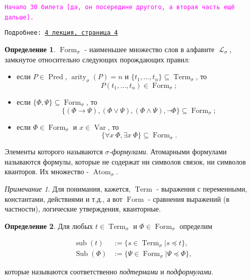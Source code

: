 \documentclass[a4paper,100pt]{article}
\theoremstyle{indented}
\theoremstyle{definition}
\newtheorem{defn}{Определение}
\theoremstyle{remark}
\newtheorem{remark}{Примечание}
\DeclareMathOperator{\ra}{\rightarrow}
\DeclareMathOperator{\LL}{\mathscr{L}}
\DeclareMathOperator{\form}{Form}
\DeclareMathOperator{\Pred}{Pred}
\DeclareMathOperator{\arity}{arity}
\DeclareMathOperator{\Var}{Var}
\DeclareMathOperator{\Term}{Term}
\DeclareMathOperator{\sub}{sub}
\DeclareMathOperator{\Sub}{Sub}
\DeclareMathOperator{\Atom}{Atom}
\begin{document}
\hrulefill

\texttt{\hypertarget{b30}{\textcolor{magenta}{Начало 30 билета [да, он посередине другого, а вторая часть ещё дальше].}}} \ 

\texttt{Подробнее: \href{http://www.mi-ras.ru/~speranski/courses/logic-1-2021-spring/slides_4.pdf}{4 лекция, страница 4}} 

\begin{defn}
  $\form_\sigma$ - наименьшее множество слов в алфавите $\LL_\sigma$, замкнутое относительно следующих порождающих правил:

  \begin{itemize}
    \item если $P\in \Pred$, $\arity_\sigma(P)=n$ и $\{t_1, \ldots, t_n\}\subseteq \Term_\sigma$, то 
    \[
      P(t_1, \ldots, t_n)\in \form_\sigma; 
    \]
    \item если $\{\Phi, \Psi\}\subseteq \form_\sigma$, то 
    \[
      \{(\Phi\ra \Psi), (\Phi\vee \Psi), (\Phi\wedge \Psi), \neg \Phi \} \subseteq \form_\sigma; 
    \]
    \item если $\Phi \in \form_\sigma$ и $x \in \Var$, то
    \[
      \{\forall x \: \Phi, \exists x \: \Phi\} \subseteq \form_\sigma.
    \]
  \end{itemize}

  Элементы которого называются \textit{$\sigma$-формулами}. Атомарными формулами называются формулы, которые не содержат ни символов связок, ни символов кванторов. Их множество - $\Atom_\sigma$. 
\end{defn}

\begin{remark}
  Для понимания, кажется, $\Term$ - выражения с переменными, константами, действиями и т.д., а вот $\form$ - сравнения выражений (в частности), логические утверждения, кванторные.
\end{remark}

\begin{defn}
  Для любых $t\in \Term_\sigma$ и $\Phi\in \form_\sigma$ определим 

  \begin{equation*}
    \begin{aligned}
      \sub(t) & := \{s \in \Term_\sigma | s\preccurlyeq t\}, \\
      \Sub(\Phi) & := \{\Psi \in \form_\sigma | \Psi\preccurlyeq \Phi\}, 
    \end{aligned}
  \end{equation*}

  которые называются соответственно \textit{подтермами} и \textit{подформулами}.
\end{defn}
\end{document}
